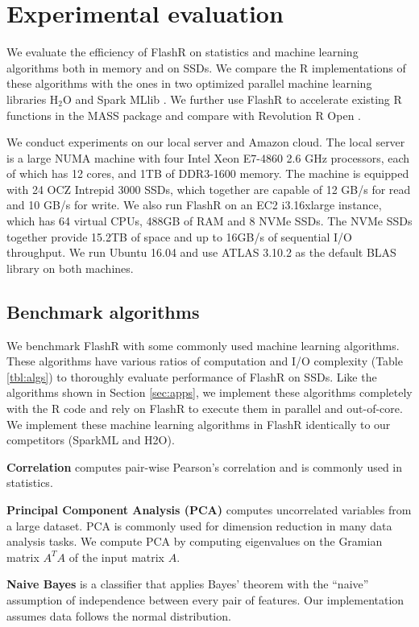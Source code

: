 \section{Experimental evaluation}
We evaluate the efficiency of FlashR on statistics and machine learning
algorithms both in memory and on SSDs. We compare the R implementations of
these algorithms with the ones in two optimized parallel machine learning
libraries H$_2$O \cite{h2o} and Spark MLlib \cite{mllib}. We further use FlashR
to accelerate existing R functions in the MASS package and compare with
Revolution R Open \cite{rro}.

We conduct experiments on our local server and Amazon cloud. The local server
is a large NUMA machine with four Intel Xeon E7-4860 2.6 GHz processors,
each of which has 12 cores, and 1TB of DDR3-1600 memory. The machine is equipped
with 24 OCZ Intrepid 3000 SSDs, which together are capable of 12 GB/s for read
and 10 GB/s for write. We also run FlashR on an EC2 i3.16xlarge instance,
which has 64 virtual CPUs, 488GB of RAM and 8 NVMe SSDs. The NVMe SSDs together
provide 15.2TB of space and up to 16GB/s of sequential I/O throughput.
We run Ubuntu 16.04 and use ATLAS 3.10.2 as the default BLAS library on both
machines.

\subsection{Benchmark algorithms}\label{benchalg}
We benchmark FlashR with some commonly used machine learning algorithms.
These algorithms have various ratios of computation and I/O complexity
(Table \ref{tbl:algs}) to thoroughly evaluate performance of FlashR on SSDs.
Like the algorithms
shown in Section \ref{sec:apps}, we implement these algorithms completely with
the R code and rely on FlashR to execute them in parallel and out-of-core.
We implement these machine learning algorithms in FlashR identically to our
competitors (SparkML and H2O). 

\noindent \textbf{Correlation} computes pair-wise Pearson's correlation
\cite{cor} and is commonly used in statistics.

\noindent \textbf{Principal Component Analysis (PCA)} computes uncorrelated
variables from a large dataset. PCA is commonly used for dimension reduction
in many data analysis tasks. We compute PCA by computing eigenvalues on the Gramian
matrix $A^T A$ of the input matrix $A$.

\noindent \textbf{Naive Bayes} is a classifier that applies Bayes' theorem
with the ``naive'' assumption of independence between every pair of features.
Our implementation assumes data follows the normal distribution.

